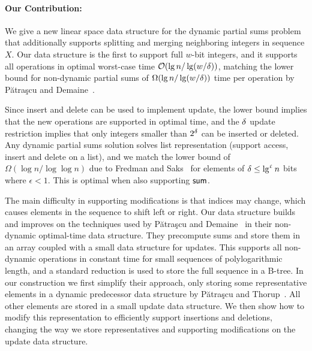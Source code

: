 \paragraph{Our Contribution: } 
We give a new linear space data structure for the dynamic partial sums problem that additionally supports splitting and merging neighboring integers in sequence $X$. Our data structure is the first to support full $w$-bit integers, and it supports all operations in optimal worst-case time $\mathcal{O}(\lg n / \lg (w / \delta))$, matching the lower bound for non-dynamic partial sums of $\Omega(\lg n / \lg (w / \delta))$ time per operation by Pătraşcu and Demaine~\cite{puaatracscu2004tight}. 

Since insert and delete can be used to implement update, the lower bound implies that the new operations are supported in optimal time, and the $\delta$ update restriction implies that only integers smaller than $2^\delta$ can be inserted or deleted.
Any dynamic partial sums solution solves list representation (support access, insert and delete on a list), and we match the lower bound of $\Omega(\log n / \log \log n)$ due to Fredman and Saks~\cite{fredman1989cell} for elements of $\delta \leq \lg^\upvarepsilon n$ bits where $\epsilon < 1$. This is optimal when also supporting $\mathsf{sum}$.
 
The main difficulty in supporting modifications is that indices may change, which causes elements in the sequence to shift left or right. 
Our data structure builds and improves on the techniques used by Pătraşcu and Demaine~\cite{puaatracscu2004tight} in their non-dynamic optimal-time data structure.
They precompute sums and store them in an array coupled with a small data structure for updates. This supports all non-dynamic operations in constant time for small sequences of polylogarithmic length, and a standard reduction is used to store the full sequence in a B-tree.
In our construction we first simplify their approach,
only storing some representative elements in a dynamic predecessor data structure by Pătraşcu and Thorup~\cite{patrascu2014dynamic}. All other elements are stored in a small update data structure. We then show how to modify this representation to efficiently support insertions and deletions, changing the way we store representatives and supporting modifications on the update data structure. 


